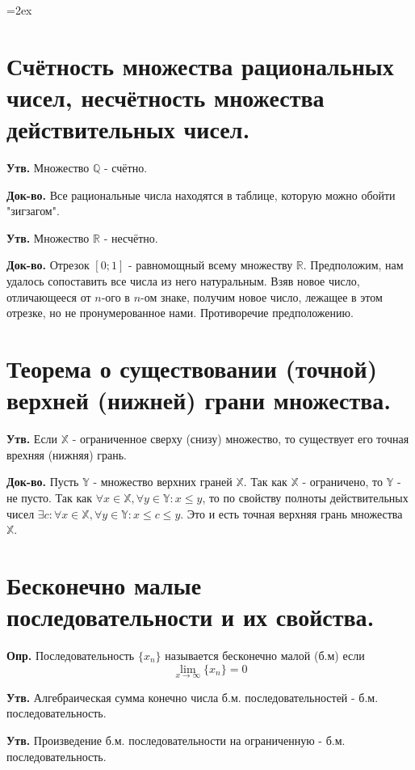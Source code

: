\documentclass[a4paper,12pt]{article}
\begin{document}
\begin{flushleft}
\parskip=2ex
\section{Счётность множества рациональных чисел, несчётность множества действительных чисел.}

	\textbf{Утв.} Множество $\mathbb{Q}$ - счётно.
	
	\textbf{Док-во.} Все рациональные числа находятся в таблице, которую можно обойти "зигзагом".

	\textbf{Утв.} Множество $\mathbb{R}$ - несчётно.
	
	\textbf{Док-во.} Отрезок $[0; 1]$ - равномощный всему множеству $\mathbb{R}$. 
	Предположим, нам удалось сопоставить все числа из него натуральным. 
	Взяв новое число, отличающееся от $n$-ого в $n$-ом знаке, получим новое число, лежащее в этом отрезке, но не пронумерованное нами.
	Противоречие предположению. 

\section{Теорема о существовании (точной) верхней (нижней) грани множества.}

	\textbf{Утв.} Если $\mathbb{X}$ - ограниченное сверху (снизу) множество, то существует его точная врехняя (нижняя) грань.

	\textbf{Док-во.} Пусть $\mathbb{Y}$ - множество верхних граней $\mathbb{X}$. Так как $\mathbb{X}$ - ограничено, то $\mathbb{Y}$ - не пусто.
	Так как $\forall x \in \mathbb{X}, \forall y \in \mathbb{Y}: x \leq y$, то по свойству полноты действительных чисел $\exists c: \forall x \in \mathbb{X}, \forall y \in \mathbb{Y}: x \leq c \leq y$. Это и есть точная верхняя грань множества $\mathbb{X}$.
	
\section{Бесконечно малые последовательности и их свойства.}

	\textbf{Опр.} Последовательность $\{x_n\}$ называется бесконечно малой (б.м) если 
	$$\lim_{x \to \infty} \{x_n\} = 0$$
	
	\textbf{Утв.} Алгебраическая сумма конечно числа б.м. последовательностей - б.м. последовательность.

	\textbf{Утв.} Произведение б.м. последовательности на ограниченную - б.м. последовательность.
	

\end{flushleft}
\end{document}
